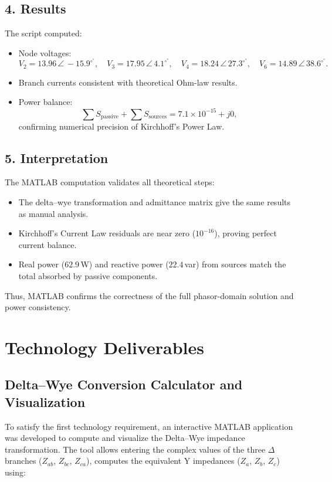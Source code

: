 \documentclass{article}
\newcommand{\ang}[1]{\,\angle\,#1^{\circ}}
\begin{document}
\subsection*{4. Results}

The script computed:
\begin{itemize}
    \item Node voltages: 
    \[
    V_2 = 13.96\ang{-15.9^{\circ}}, \quad
    V_3 = 17.95\ang{4.1^{\circ}}, \quad
    V_4 = 18.24\ang{27.3^{\circ}}, \quad
    V_6 = 14.89\ang{38.6^{\circ}}.
    \]
    \item Branch currents consistent with theoretical Ohm-law results.
    \item Power balance:
    \[
    \sum S_{\text{passive}} + \sum S_{\text{sources}} = 7.1\times10^{-15} + j0,
    \]
    confirming numerical precision of Kirchhoff’s Power Law.
\end{itemize}

\subsection*{5. Interpretation}
The MATLAB computation validates all theoretical steps:
\begin{itemize}
    \item The delta–wye transformation and admittance matrix give the same results as manual analysis.
    \item Kirchhoff’s Current Law residuals are near zero ($10^{-16}$), proving perfect current balance.
    \item Real power ($62.9$\,W) and reactive power ($22.4$\,var) from sources match the total absorbed by passive components.
\end{itemize}

Thus, MATLAB confirms the correctness of the full phasor-domain solution and power consistency.



\section{Technology Deliverables}

\subsection*{Delta–Wye Conversion Calculator and Visualization}

To satisfy the first technology requirement, an interactive MATLAB application was developed to compute and visualize the Delta–Wye impedance transformation.
The tool allows entering the complex values of the three $\Delta$ branches ($Z_{ab}$, $Z_{bc}$, $Z_{ca}$), computes the equivalent $\text{Y}$ impedances ($Z_a$, $Z_b$, $Z_c$) using:
\end{document}
